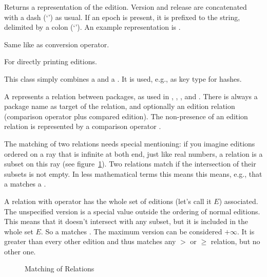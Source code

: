 \documentclass[10pt]{article}
\begin{document}
Returns a  representation of the edition. Version and
release are concatenated with a dash (`\val{-}') as usual. If an epoch
is present, it is prefixed to the string, delimited by a colon
(`\val{:}'). An example representation is .

Same like  as conversion operator.

For directly printing editions.




This class simply combines a  and a .
It is used, e.g., as key type for hashes.




A  represents a relation between packages, as used
in , , , and
. There is always a package name as target of the
relation, and optionally an edition relation (comparison operator plus
compared edition). The non-presence of an edition relation is
represented by a comparison operator .

The matching of two relations needs special mentioning: if you imagine
editions ordered on a ray that is infinite at both end, just like real
numbers, a relation is a subset on this ray (see
figure~\ref{editionray}). Two relations match if the intersection of
their subsets is not empty. In less mathematical terms this means this
means, e.g., that a  matches a .

A relation with operator  has the whole set of editions
(let's call it $E$) associated. The unspecified version is a special
value outside the ordering of normal editions. This means that it
doesn't intersect with any subset, but it is included in the whole set
$E$. So a  matches . The maximum version can be considered $+\infty$.
It is greater than every other edition and thus matches any $>$ or
$\ge$ relation, but no other one.

\begin{figure}
\caption{Matching of Relations}
\label{editionray}
\end{figure}
\end{document}
